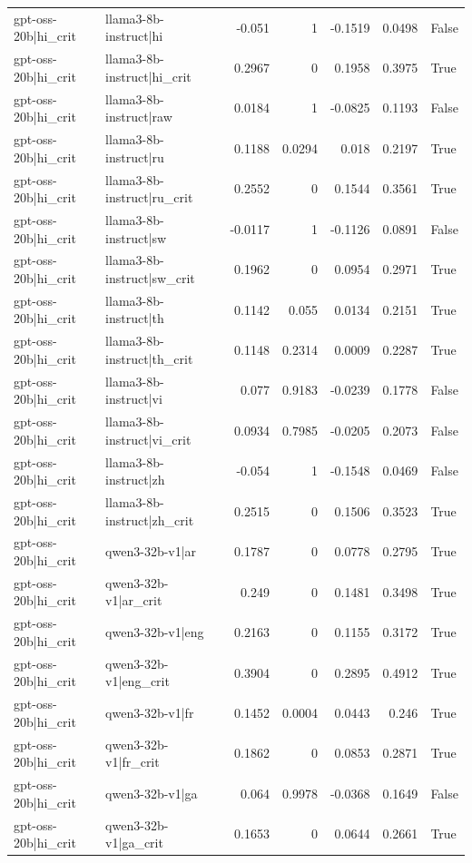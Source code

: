 \begin{table}
\begin{tabular}{l l r r r r l}
gpt-oss-20b|hi_crit & llama3-8b-instruct|hi & -0.051 & 1 & -0.1519 & 0.0498 & False \\
gpt-oss-20b|hi_crit & llama3-8b-instruct|hi_crit & 0.2967 & 0 & 0.1958 & 0.3975 & True \\
gpt-oss-20b|hi_crit & llama3-8b-instruct|raw & 0.0184 & 1 & -0.0825 & 0.1193 & False \\
gpt-oss-20b|hi_crit & llama3-8b-instruct|ru & 0.1188 & 0.0294 & 0.018 & 0.2197 & True \\
gpt-oss-20b|hi_crit & llama3-8b-instruct|ru_crit & 0.2552 & 0 & 0.1544 & 0.3561 & True \\
gpt-oss-20b|hi_crit & llama3-8b-instruct|sw & -0.0117 & 1 & -0.1126 & 0.0891 & False \\
gpt-oss-20b|hi_crit & llama3-8b-instruct|sw_crit & 0.1962 & 0 & 0.0954 & 0.2971 & True \\
gpt-oss-20b|hi_crit & llama3-8b-instruct|th & 0.1142 & 0.055 & 0.0134 & 0.2151 & True \\
gpt-oss-20b|hi_crit & llama3-8b-instruct|th_crit & 0.1148 & 0.2314 & 0.0009 & 0.2287 & True \\
gpt-oss-20b|hi_crit & llama3-8b-instruct|vi & 0.077 & 0.9183 & -0.0239 & 0.1778 & False \\
gpt-oss-20b|hi_crit & llama3-8b-instruct|vi_crit & 0.0934 & 0.7985 & -0.0205 & 0.2073 & False \\
gpt-oss-20b|hi_crit & llama3-8b-instruct|zh & -0.054 & 1 & -0.1548 & 0.0469 & False \\
gpt-oss-20b|hi_crit & llama3-8b-instruct|zh_crit & 0.2515 & 0 & 0.1506 & 0.3523 & True \\
gpt-oss-20b|hi_crit & qwen3-32b-v1|ar & 0.1787 & 0 & 0.0778 & 0.2795 & True \\
gpt-oss-20b|hi_crit & qwen3-32b-v1|ar_crit & 0.249 & 0 & 0.1481 & 0.3498 & True \\
gpt-oss-20b|hi_crit & qwen3-32b-v1|eng & 0.2163 & 0 & 0.1155 & 0.3172 & True \\
gpt-oss-20b|hi_crit & qwen3-32b-v1|eng_crit & 0.3904 & 0 & 0.2895 & 0.4912 & True \\
gpt-oss-20b|hi_crit & qwen3-32b-v1|fr & 0.1452 & 0.0004 & 0.0443 & 0.246 & True \\
gpt-oss-20b|hi_crit & qwen3-32b-v1|fr_crit & 0.1862 & 0 & 0.0853 & 0.2871 & True \\
gpt-oss-20b|hi_crit & qwen3-32b-v1|ga & 0.064 & 0.9978 & -0.0368 & 0.1649 & False \\
gpt-oss-20b|hi_crit & qwen3-32b-v1|ga_crit & 0.1653 & 0 & 0.0644 & 0.2661 & True \\

\end{tabular}
\end{table}
